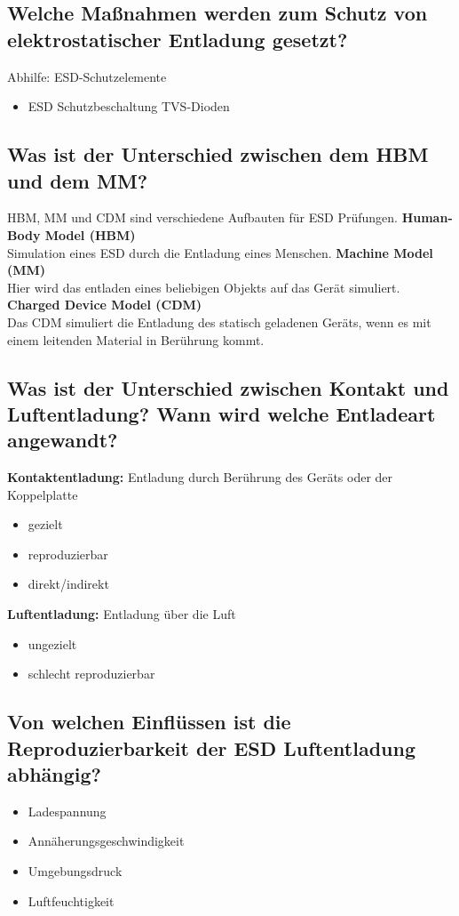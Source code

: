 \subsection{Welche Maßnahmen werden zum Schutz von elektrostatischer Entladung gesetzt?}
Abhilfe: ESD-Schutzelemente
\begin{itemize}
  \item ESD Schutzbeschaltung TVS-Dioden
\end{itemize}

\subsection{Was ist der Unterschied zwischen dem HBM und dem MM?}
HBM, MM und CDM sind verschiedene Aufbauten für ESD Prüfungen.\p
%
\textbf{Human-Body Model (HBM)}\\
Simulation eines ESD durch die Entladung eines Menschen.\p
%
\textbf{Machine Model (MM)}\\
Hier wird das entladen eines beliebigen Objekts auf das Gerät simuliert.\p
%
\textbf{Charged Device Model (CDM)}\\
Das CDM simuliert die Entladung des statisch geladenen Geräts, wenn es mit einem leitenden Material in Berührung kommt.\p

\subsection{Was ist der Unterschied zwischen Kontakt und Luftentladung? Wann wird welche Entladeart angewandt?}
\textbf{Kontaktentladung:}
Entladung durch Berührung des Geräts oder der Koppelplatte
%
\begin{itemize}
  \item gezielt
  \item reproduzierbar
  \item direkt/indirekt
\end{itemize}
%
\textbf{Luftentladung:}
Entladung über die Luft
%
\begin{itemize}
  \item ungezielt
  \item schlecht reproduzierbar
\end{itemize}

\subsection{Von welchen Einflüssen ist die Reproduzierbarkeit der ESD Luftentladung abhängig?}
\begin{itemize}
  \item Ladespannung
  \item Annäherungsgeschwindigkeit
  \item Umgebungsdruck
  \item Luftfeuchtigkeit
\end{itemize}

